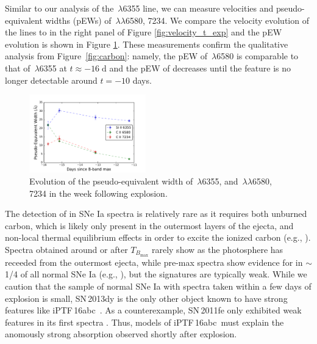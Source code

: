 \documentclass[twocolumn]{aastex61}
\newcommand{\abc}{iPTF\,16abc}
\begin{document}
Similar to our analysis of the \,$\lambda$6355 line, we 
can measure velocities and pseudo-equivalent widths (pEWs) of 
\,$\lambda\lambda$6580, 7234. We compare the velocity 
evolution of the  lines to  in the right panel 
of Figure \ref{fig:velocity_t_exp} and the pEW evolution is
shown in Figure \ref{fig:ew}. These measurements confirm the qualitative analysis from Figure~\ref{fig:carbon}: namely, the pEW of \,$\lambda$6580 is comparable to that
of \,$\lambda$6355 at $t \approx -16 \; \mathrm{d}$ and 
the pEW of  
decreases until the feature is no longer detectable 
around $t=-10$ days.

\begin{figure}[]
  \centering
  \includegraphics[width=0.45\textwidth]{pEW.pdf}
  \caption{Evolution of the pseudo-equivalent width of 
  \,$\lambda$6355, and \,$\lambda\lambda$6580, 
  7234 in the week following explosion.}
  \label{fig:ew}
\end{figure}

The detection of  in SNe Ia spectra is relatively rare
as it requires both unburned carbon, which is likely only present in the outermost layers of the ejecta, and non-local thermal equilibrium effects in order to excite the ionized carbon (e.g., \citealt{2007ApJ...654L..53T}). Spectra obtained around or after $T_{B_\mathrm{max}}$ rarely show  as the photosphere has receeded from the outermost ejecta, while pre-max spectra show evidence for  in $\sim$1/4 of all normal SNe Ia (e.g., \citealt{2011ApJ...732...30P,2012MNRAS.425.1917S,2011ApJ...743...27T}), but the signatures are typically weak. While we caution that the sample of normal SNe Ia with spectra taken within a few days of explosion is small, SN\,2013dy is the only other object known to have strong  features like \abc\ \citet{2013ApJ...778L..15Z}. As a counterexample, SN\,2011fe only exhibited weak  features in its first spectra
\citep{2012ApJ...752L..26P}. Thus, models of \abc\ must explain the anomously strong  absorption observed shortly after explosion.
\end{document}
